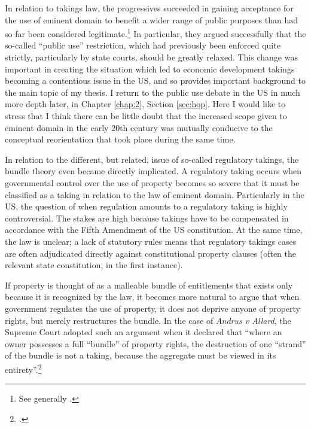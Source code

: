 In relation to takings law, the progressives succeeded in gaining acceptance for the use of eminent domain to benefit a wider range of public purposes than had so far been considered legitimate.\footnote{See generally \cite{yale49}.} In particular, they argued successfully that the so-called ``public use'' restriction, which had previously been enforced quite strictly, particularly by state courts, should be greatly relaxed. This change was important in creating the situation which led to economic development takings becoming a contentious issue in the US, and so provides important background to the main topic of my thesis.  I return to the public use debate in the US in much more depth later, in Chapter \ref{chap:2}, Section \ref{sec:hop}. Here I would like to stress that I think there can be little doubt that the increased scope given to eminent domain in the early 20th century was mutually conducive to the conceptual reorientation that took place during the same time.

In relation to the different, but related, issue of so-called regulatory takings, the bundle theory even  became directly implicated. A regulatory taking occurs when governmental control over the use of property becomes so severe that it must be classified as a taking in relation to the law of eminent domain. Particularly in the US, the question of when regulation amounts to a regulatory taking is highly controversial. The stakes are high because takings have to be compensated in accordance with the Fifth Amendment of the US constitution. At the same time, the law is unclear; a lack of statutory rules means that regulatory takings cases are often adjudicated directly against constitutional property clauses (often the relevant state constitution, in the first instance).

If property is thought of as a malleable bundle of entitlements that exists only because it is recognized by the law, it becomes more natural to argue that when government regulates the use of property, it does not deprive anyone of property rights, but merely restructures the bundle. In the case of {\it Andrus v Allard}, the Supreme Court adopted such an argument when it declared that ``where an owner possesses a full ``bundle'' of property rights, the destruction of one ``strand'' of the bundle is not a taking, because the aggregate must be viewed in its entirety''.\footcite[65--66]{andrus79}

